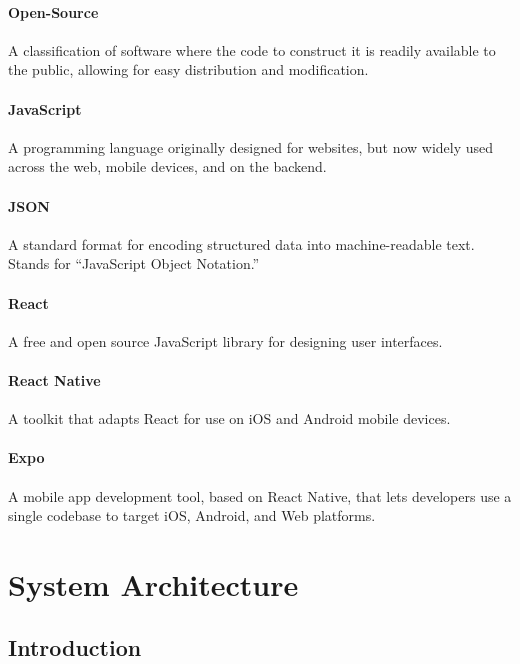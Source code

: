 \documentclass[11pt,letterpaper]{article}
\begin{document}
\paragraph{Open-Source}
A classification of software where the code to construct it is readily available to the public, allowing for easy distribution and modification.

\paragraph{JavaScript}
A programming language originally designed for websites, but now widely used across the web, mobile devices, and on the backend.

\paragraph{JSON}
A standard format for encoding structured data into machine-readable text. Stands for ``JavaScript Object Notation.''

\paragraph{React}
A free and open source JavaScript library for designing user interfaces. 

\paragraph{React Native}
A toolkit that adapts React for use on iOS and Android mobile devices.

\paragraph{Expo}
A mobile app development tool, based on React Native, that lets developers use a single codebase to target iOS, Android, and Web platforms.


\section{System Architecture}

\subsection{Introduction}
\end{document}
